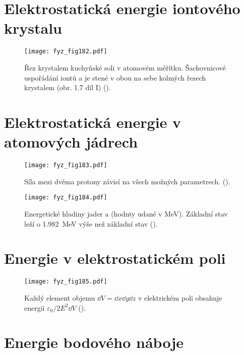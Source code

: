 {\section{Elektrostatická energie iontového krystalu}\label{fyz:IIchapVIsecIII}

  \begin{figure}[ht!]  %
    \centering
    \texttt{[image: fyz\_fig182.pdf]}
    \caption{Řez krystalem kuchyňské soli v atomovém měřítku. Šachovnicové uspořádání iontů  
             a  je stené v obou na sebe kolmých řezech krystalem (obr. 1.7 díl I)
             (\cite[s.~146]{Feynman02}).}
    \label{fyz:fig182}
  \end{figure}

\section{Elektrostatická energie v atomových jádrech}\label{fyz:IIchapVIsecIV}

  \begin{figure}[ht!]  %
    \centering
    \texttt{[image: fyz\_fig183.pdf]}
    \caption{Síla mezi dvěma protony závisí na všech možných parametrech. 
             (\cite[s.~148]{Feynman02}).}
    \label{fyz:fig183}
  \end{figure}

  \begin{figure}[ht!]  %
    \centering
    \texttt{[image: fyz\_fig184.pdf]}
    \caption{Energetické hladiny jader  a  (hodnty udané v 
             \si{\mega\electronvolt}). Základní stav  leží o 
             \SI{1.982}{\mega\electronvolt} výše než základní stav 
             (\cite[s.~149]{Feynman02}).}
    \label{fyz:fig184}
  \end{figure}
  
\section{Energie v elektrostatickém poli}\label{fyz:IIchapVIsecV}

  \begin{figure}[ht!]  %
    \centering
    \texttt{[image: fyz\_fig185.pdf]}
    \caption{Každý element objemu \(\dd{V} = \dd{x}\dd{y}\dd{z}\) v elektrickém  poli obsahuje 
    energii \(\varepsilon_0/2E^2\dd{V}\) 
             (\cite[s.~154]{Feynman02}).}
    \label{fyz:fig185}
  \end{figure}
  
\section{Energie bodového náboje}\label{fyz:IIchapVIsecVI}
} %
\printbibliography[title={Seznam literatury}, heading=subbibliography]
